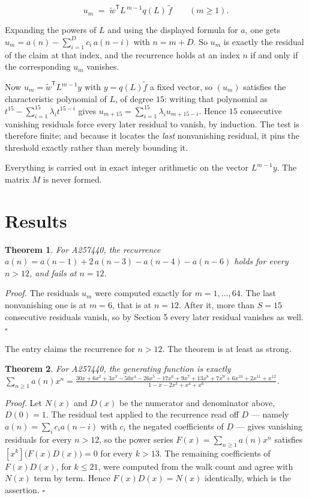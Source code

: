 \documentclass[11pt]{article}
\newtheorem{theorem}{Theorem}
\theoremstyle{definition}
\begin{document}
\[u_m \;=\; \tilde w^{\mathsf T} L^{\,m-1} q(L)\,\tilde f \qquad (m \ge 1).\]

Expanding the powers of $L$ and using the displayed formula for $a$, one gets $u_m = a(n) - \sum_{i=1}^{D} c_i\,a(n-i)$ with $n = m + D$. So $u_m$ is exactly the residual of the claim at that index, and the recurrence holds at an index $n$ if and only if the corresponding $u_m$ vanishes.

Now $u_m = \tilde w^{\mathsf T} L^{m-1} y$ with $y = q(L)\tilde f$ a fixed vector, so $(u_m)$ satisfies the characteristic polynomial of $L$, of degree $15$: writing that polynomial as $t^{15} - \sum_{i=1}^{15} \lambda_i t^{15-i}$ gives $u_{m+15} = \sum_{i=1}^{15} \lambda_i u_{m+15-i}$. Hence $15$ consecutive vanishing residuals force every later residual to vanish, by induction. The test is therefore finite; and because it locates the {\itshape last} nonvanishing residual, it pins the threshold exactly rather than merely bounding it.

Everything is carried out in exact integer arithmetic on the vector $L^{m-1}y$. The matrix $M$ is never formed.

\section{Results}

\begin{theorem} For A257440, the recurrence $a(n) = a(n-1) + 2\,a(n-3) - a(n-4) - a(n-6)$ holds for every $n > 12$, and fails at $n = 12$.\end{theorem}

{\itshape Proof.} The residuals $u_m$ were computed exactly for $m = 1,\dots,64$. The last nonvanishing one is at $m = 6$, that is at $n = 12$. After it, more than $S = 15$ consecutive residuals vanish, so by Section 5 every later residual vanishes as well. $\square$

The entry claims the recurrence for $n > 12$. The theorem is at least as strong.

\begin{theorem} For A257440, the generating function is exactly $\sum_{n\ge 1} a(n)x^n = \frac{30x + 6x^{2} + 3x^{3} - 50x^{4} - 26x^{5} - 17x^{6} + 9x^{7} + 13x^{8} + 7x^{9} + 6x^{10} + 2x^{11} + x^{12}}{1 - x - 2x^{3} + x^{4} + x^{6}}$.\end{theorem}

{\itshape Proof.} Let $N(x)$ and $D(x)$ be the numerator and denominator above, $D(0)=1$. The residual test applied to the recurrence read off $D$ --- namely $a(n) = \sum_i c_i a(n-i)$ with $c_i$ the negated coefficients of $D$ --- gives vanishing residuals for every $n > 12$, so the power series $F(x)=\sum_{n\ge 1}a(n)x^n$ satisfies $[x^k]\bigl(F(x)D(x)\bigr) = 0$ for every $k > 13$. The remaining coefficients of $F(x)D(x)$, for $k \le 21$, were computed from the walk count and agree with $N(x)$ term by term. Hence $F(x)D(x) = N(x)$ identically, which is the assertion. $\square$
\end{document}
